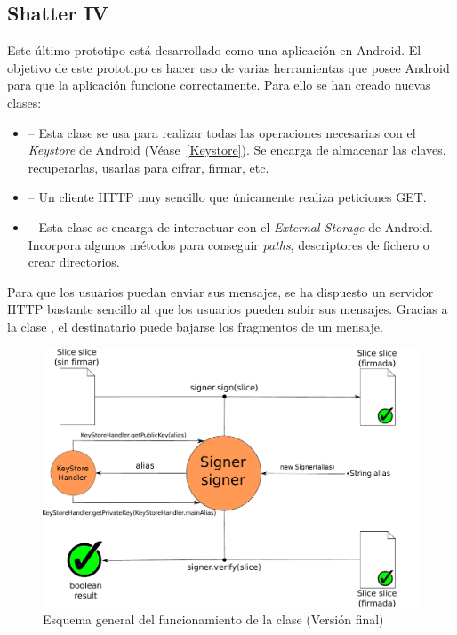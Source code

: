 \subsection{Shatter IV}

Este último prototipo está desarrollado como una aplicación en Android. El objetivo de este prototipo es hacer uso de varias herramientas que posee Android para que la aplicación funcione correctamente. Para ello se han creado nuevas clases:

\begin{itemize}
  \item {} -- Esta clase se usa para realizar todas las operaciones necesarias con el \emph{Keystore} de Android (Véase~\ref{Keystore}). Se encarga de almacenar las claves, recuperarlas, usarlas para cifrar, firmar, etc.

  \item {} -- Un cliente HTTP muy sencillo que únicamente realiza peticiones GET.

  \item {} -- Esta clase se encarga de interactuar con el \emph{External Storage} de Android. Incorpora algunos métodos para conseguir \emph{paths}, descriptores de fichero o crear directorios.
\end{itemize}

Para que los usuarios puedan enviar sus mensajes, se ha dispuesto un servidor HTTP bastante sencillo al que los usuarios pueden subir sus mensajes. Gracias a la clase , el destinatario puede bajarse los fragmentos de un mensaje.

\begin{figure}[!htb]
  \centering
  \includegraphics[scale=0.5]{Figures/Signer_2}
  \decoRule
  \caption[ (Versión final)]{Esquema general del funcionamiento de la clase  (Versión final)}
  \label{fig:Signer_2}
\end{figure}


